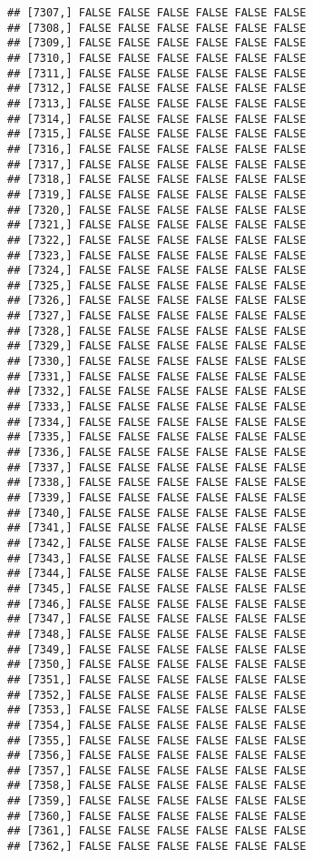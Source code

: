 \documentclass[
]{article}
\begin{document}
\begin{verbatim}
## [7307,] FALSE FALSE FALSE FALSE FALSE FALSE
## [7308,] FALSE FALSE FALSE FALSE FALSE FALSE
## [7309,] FALSE FALSE FALSE FALSE FALSE FALSE
## [7310,] FALSE FALSE FALSE FALSE FALSE FALSE
## [7311,] FALSE FALSE FALSE FALSE FALSE FALSE
## [7312,] FALSE FALSE FALSE FALSE FALSE FALSE
## [7313,] FALSE FALSE FALSE FALSE FALSE FALSE
## [7314,] FALSE FALSE FALSE FALSE FALSE FALSE
## [7315,] FALSE FALSE FALSE FALSE FALSE FALSE
## [7316,] FALSE FALSE FALSE FALSE FALSE FALSE
## [7317,] FALSE FALSE FALSE FALSE FALSE FALSE
## [7318,] FALSE FALSE FALSE FALSE FALSE FALSE
## [7319,] FALSE FALSE FALSE FALSE FALSE FALSE
## [7320,] FALSE FALSE FALSE FALSE FALSE FALSE
## [7321,] FALSE FALSE FALSE FALSE FALSE FALSE
## [7322,] FALSE FALSE FALSE FALSE FALSE FALSE
## [7323,] FALSE FALSE FALSE FALSE FALSE FALSE
## [7324,] FALSE FALSE FALSE FALSE FALSE FALSE
## [7325,] FALSE FALSE FALSE FALSE FALSE FALSE
## [7326,] FALSE FALSE FALSE FALSE FALSE FALSE
## [7327,] FALSE FALSE FALSE FALSE FALSE FALSE
## [7328,] FALSE FALSE FALSE FALSE FALSE FALSE
## [7329,] FALSE FALSE FALSE FALSE FALSE FALSE
## [7330,] FALSE FALSE FALSE FALSE FALSE FALSE
## [7331,] FALSE FALSE FALSE FALSE FALSE FALSE
## [7332,] FALSE FALSE FALSE FALSE FALSE FALSE
## [7333,] FALSE FALSE FALSE FALSE FALSE FALSE
## [7334,] FALSE FALSE FALSE FALSE FALSE FALSE
## [7335,] FALSE FALSE FALSE FALSE FALSE FALSE
## [7336,] FALSE FALSE FALSE FALSE FALSE FALSE
## [7337,] FALSE FALSE FALSE FALSE FALSE FALSE
## [7338,] FALSE FALSE FALSE FALSE FALSE FALSE
## [7339,] FALSE FALSE FALSE FALSE FALSE FALSE
## [7340,] FALSE FALSE FALSE FALSE FALSE FALSE
## [7341,] FALSE FALSE FALSE FALSE FALSE FALSE
## [7342,] FALSE FALSE FALSE FALSE FALSE FALSE
## [7343,] FALSE FALSE FALSE FALSE FALSE FALSE
## [7344,] FALSE FALSE FALSE FALSE FALSE FALSE
## [7345,] FALSE FALSE FALSE FALSE FALSE FALSE
## [7346,] FALSE FALSE FALSE FALSE FALSE FALSE
## [7347,] FALSE FALSE FALSE FALSE FALSE FALSE
## [7348,] FALSE FALSE FALSE FALSE FALSE FALSE
## [7349,] FALSE FALSE FALSE FALSE FALSE FALSE
## [7350,] FALSE FALSE FALSE FALSE FALSE FALSE
## [7351,] FALSE FALSE FALSE FALSE FALSE FALSE
## [7352,] FALSE FALSE FALSE FALSE FALSE FALSE
## [7353,] FALSE FALSE FALSE FALSE FALSE FALSE
## [7354,] FALSE FALSE FALSE FALSE FALSE FALSE
## [7355,] FALSE FALSE FALSE FALSE FALSE FALSE
## [7356,] FALSE FALSE FALSE FALSE FALSE FALSE
## [7357,] FALSE FALSE FALSE FALSE FALSE FALSE
## [7358,] FALSE FALSE FALSE FALSE FALSE FALSE
## [7359,] FALSE FALSE FALSE FALSE FALSE FALSE
## [7360,] FALSE FALSE FALSE FALSE FALSE FALSE
## [7361,] FALSE FALSE FALSE FALSE FALSE FALSE
## [7362,] FALSE FALSE FALSE FALSE FALSE FALSE

\end{verbatim}
\end{document}
